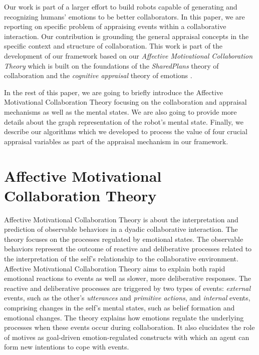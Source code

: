 \documentclass[letterpaper]{article}
\begin{document}
Our work is part of a larger effort to build robots capable of generating and
recognizing humans' emotions to be better collaborators. In this paper, we are
reporting on specific problem of appraising events within a collaborative
interaction. Our contribution is grounding the general appraisal concepts in the
specific context and structure of collaboration. This work is part of the
development of our framework based on our \textit{Affective Motivational
Collaboration Theory} which is built on the foundations of the
\textit{SharedPlans} theory of collaboration \cite{grosz:plans-discourse} and
the \textit{cognitive appraisal} theory of emotions
\cite{gratch:domain-independent}.

In the rest of this paper, we are going to briefly introduce the Affective
Motivational Collaboration Theory focusing on the collaboration and appraisal
mechanisms as well as the mental states. We are also going to provide more
details about the graph representation of the robot's mental state. Finally, we
describe our algorithms which we developed to process the value of four crucial
appraisal variables as part of the appraisal mechanism in our framework.

\vspace*{-2mm}
\section{Affective Motivational Collaboration Theory}

Affective Motivational Collaboration Theory is about the interpretation and
prediction of observable behaviors in a dyadic collaborative interaction. The
theory focuses on the processes regulated by emotional states. The observable
behaviors represent the outcome of reactive and deliberative processes related
to the interpretation of the self's relationship to the collaborative
environment. Affective Motivational Collaboration Theory aims to explain both
rapid emotional reactions to events as well as slower, more deliberative
responses. The reactive and deliberative processes are triggered by two types of
events: \textit{external} events, such as the other's
\textit{utterances} and \textit{primitive actions}, and \textit{internal}
events, comprising changes in the self's mental states, such as belief formation
and emotional changes. The theory explains how emotions regulate the underlying
processes when these events occur during collaboration. It also elucidates the
role of motives as goal-driven emotion-regulated constructs with which an agent
can form new intentions to cope with events.
\end{document}
